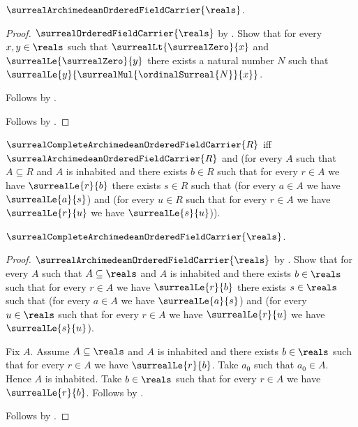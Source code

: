 \begin{theorem}\label{surreal_reals_archimedean_ordered_field_carrier}
    $\surrealArchimedeanOrderedFieldCarrier{\reals}$.
\end{theorem}
\begin{proof}
    $\surrealOrderedFieldCarrier{\reals}$
        by .
    Show that for every $x,y\in\reals$ such that
        $\surrealLt{\surrealZero}{x}$ and
        $\surrealLe{\surrealZero}{y}$ there exists a natural number
        $N$ such that
        $\surrealLe{y}{\surrealMul{\ordinalSurreal{N}}{x}}$.
    \begin{subproof}
        Follows by .
    \end{subproof}
    Follows by .
\end{proof}

\begin{definition}\label{surreal_complete_archimedean_ordered_field_carrier}
    $\surrealCompleteArchimedeanOrderedFieldCarrier{R}$ iff
        $\surrealArchimedeanOrderedFieldCarrier{R}$ and
        (for every $A$ such that $A\subseteq R$ and $A$ is inhabited and
            there exists $b\in R$ such that for every $r\in A$ we have
            $\surrealLe{r}{b}$ there exists $s\in R$ such that
            (for every $a\in A$ we have $\surrealLe{a}{s}$) and
            (for every $u\in R$ such that for every $r\in A$ we have
                $\surrealLe{r}{u}$ we have $\surrealLe{s}{u}$)).
\end{definition}

\begin{theorem}\label{surreal_reals_complete_archimedean_ordered_field}
    $\surrealCompleteArchimedeanOrderedFieldCarrier{\reals}$.
\end{theorem}
\begin{proof}
    $\surrealArchimedeanOrderedFieldCarrier{\reals}$
        by .
    Show that for every $A$ such that $A\subseteq\reals$ and
        $A$ is inhabited and there exists $b\in\reals$ such that
        for every $r\in A$ we have
        $\surrealLe{r}{b}$ there exists $s\in\reals$ such that
        (for every $a\in A$ we have $\surrealLe{a}{s}$) and
        (for every $u\in\reals$ such that for every $r\in A$ we have
            $\surrealLe{r}{u}$ we have $\surrealLe{s}{u}$).
    \begin{subproof}
        Fix $A$.
        Assume $A\subseteq\reals$ and $A$ is inhabited and there exists
            $b\in\reals$ such that for every $r\in A$ we have
            $\surrealLe{r}{b}$.
        Take $a_0$ such that $a_0\in A$.
        Hence $A$ is inhabited.
        Take $b\in\reals$ such that for every $r\in A$ we have
            $\surrealLe{r}{b}$.
        Follows by .
    \end{subproof}
    Follows by
        .
\end{proof}
